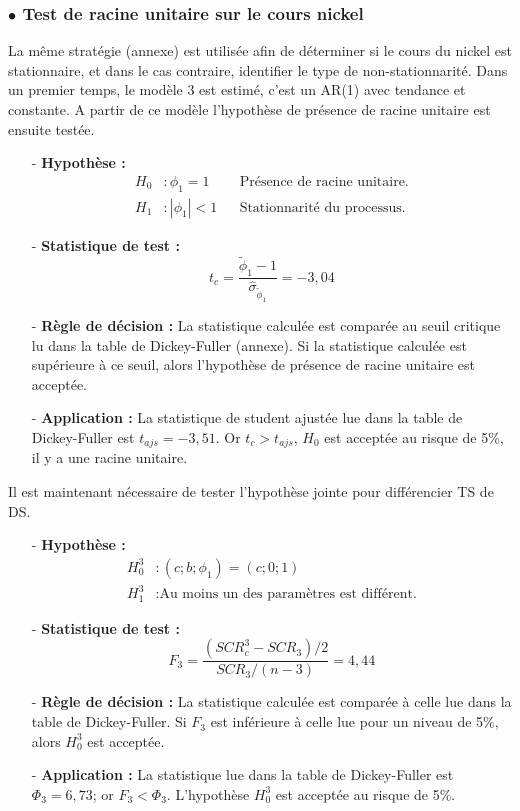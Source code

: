\subsubsection*{$\bullet$ Test de racine unitaire sur le cours nickel}
%
La même stratégie (annexe) est utilisée afin de déterminer si le cours du nickel est stationnaire, et dans le cas contraire, identifier le type de non-stationnarité.
Dans un premier temps, le modèle 3 est estimé, c'est un AR(1) avec tendance et constante. A partir de ce modèle l'hypothèse de présence de racine unitaire est ensuite 
testée.
%
\begin{itemize}
\item[-]\textbf{ Hypothèse :} 
\begin{align*}
    H_{0} &: \phi_{1} = 1  & &\text{Présence de racine unitaire.}\\
    H_{1} &:|\phi_{1}| < 1   &  &\text{Stationnarité du processus.}
\end{align*}
\item[-]\textbf{Statistique de test :} 
\begin{equation*}
    t_{c} = \frac{\tilde{\phi}_{1}- 1}{\hat{\sigma}_{\tilde{\phi}_{1}}} = -3,04
\end{equation*}
\item[-]\textbf{Règle de décision :} La statistique calculée est comparée au seuil critique lu dans la table de Dickey-Fuller (annexe). Si la statistique calculée est supérieure à ce seuil, alors l'hypothèse de présence de racine unitaire est acceptée.
\item[-]\textbf{Application :} La statistique de student ajustée lue dans la table de Dickey-Fuller est $t_{ajs} = - 3,51$. Or $t_{c} > t_{ajs}$, $H_{0}$ est acceptée 
au risque de 5\%, il y a une racine unitaire.
\end{itemize}
%
Il est maintenant nécessaire de tester l'hypothèse jointe pour différencier TS de DS.
%
\begin{itemize}
\item[-]\textbf{Hypothèse :} 
\begin{equation*}
    \begin{split}
        H_{0}^{3} &: (c; b; \phi_{1}) = (c;0;1)\\
        H_{1}^{3} &: \text{Au moins un des paramètres est différent.}
    \end{split}
\end{equation*}
\item[-]\textbf{Statistique de test :} 
\begin{equation*}
    F_{3} = \frac{(SCR_{c}^{3} - SCR_{3})/2}{SCR_{3}/(n-3)} = 4,44
\end{equation*}
\item[-]\textbf{Règle de décision :} La statistique calculée est comparée à celle lue dans la table de Dickey-Fuller. Si $F_{3}$ est inférieure à celle lue pour un niveau 
de 5\%, alors $H_{0}^{3}$ est acceptée.
\item[-]\textbf{Application :} La statistique lue dans la table de Dickey-Fuller est $\Phi_{3} = 6,73$; or $F_{3} < \Phi_{3}$. L'hypothèse $H_{0}^{3}$ est acceptée au 
risque de 5\%.
\end{itemize}
